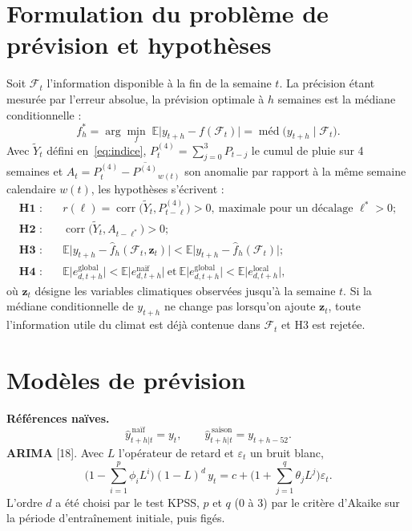 \documentclass[11pt]{article}
\begin{document}
\section{Formulation du problème de prévision et hypothèses}\label{sec:hyp}
Soit $\mathcal{F}_t$ l'information disponible à la fin de la semaine $t$. La précision étant mesurée par l'erreur absolue, la prévision optimale à $h$ semaines est la médiane conditionnelle :
\begin{equation}
f_h^{*}=\arg\min_f\;\mathbb{E}\big|y_{t+h}-f(\mathcal{F}_t)\big|=\operatorname{méd}\big(y_{t+h}\mid\mathcal{F}_t\big).
\label{eq:objectif}
\end{equation}
Avec $\tilde{Y}_t$ défini en~\eqref{eq:indice}, $P^{(4)}_t=\sum_{j=0}^{3}P_{t-j}$ le cumul de pluie sur 4 semaines et $A_t=P^{(4)}_t-\overline{P^{(4)}}_{w(t)}$ son anomalie par rapport à la même semaine calendaire $w(t)$, les hypothèses s'écrivent :
\begin{align}
\textbf{H1 :}&\quad r(\ell)=\operatorname{corr}\big(\tilde{Y}_t,P^{(4)}_{t-\ell}\big)>0,\ \text{maximale pour un décalage }\ell^{*}>0 ; \label{eq:h1}\\
\textbf{H2 :}&\quad \operatorname{corr}\big(\tilde{Y}_t,A_{t-\ell^{*}}\big)>0 ; \label{eq:h2}\\
\textbf{H3 :}&\quad \mathbb{E}\big|y_{t+h}-\hat{f}_h(\mathcal{F}_t,\mathbf{z}_t)\big|<\mathbb{E}\big|y_{t+h}-\hat{f}_h(\mathcal{F}_t)\big| ; \label{eq:h3}\\
\textbf{H4 :}&\quad \mathbb{E}\big|e^{\text{global}}_{d,t+h}\big|<\mathbb{E}\big|e^{\text{naïf}}_{d,t+h}\big|\ \text{et}\ \mathbb{E}\big|e^{\text{global}}_{d,t+h}\big|<\mathbb{E}\big|e^{\text{local}}_{d,t+h}\big| , \label{eq:h4}
\end{align}
où $\mathbf{z}_t$ désigne les variables climatiques observées jusqu'à la semaine $t$. Si la médiane conditionnelle de $y_{t+h}$ ne change pas lorsqu'on ajoute $\mathbf{z}_t$, toute l'information utile du climat est déjà contenue dans $\mathcal{F}_t$ et H3 est rejetée.

\section{Modèles de prévision}
\textbf{Références naïves.}
\begin{equation}
\hat{y}^{\,\text{naïf}}_{t+h|t}=y_t,\qquad \hat{y}^{\,\text{saison}}_{t+h|t}=y_{t+h-52}.
\label{eq:naif}
\end{equation}
\textbf{ARIMA} [18]. Avec $L$ l'opérateur de retard et $\varepsilon_t$ un bruit blanc,
\begin{equation}
\Big(1-\sum_{i=1}^{p}\phi_iL^{i}\Big)(1-L)^{d}\,y_t=c+\Big(1+\sum_{j=1}^{q}\theta_jL^{j}\Big)\varepsilon_t .
\label{eq:arima}
\end{equation}
L'ordre $d$ a été choisi par le test KPSS, $p$ et $q$ (0 à 3) par le critère d'Akaike sur la période d'entraînement initiale, puis figés.
\end{document}
